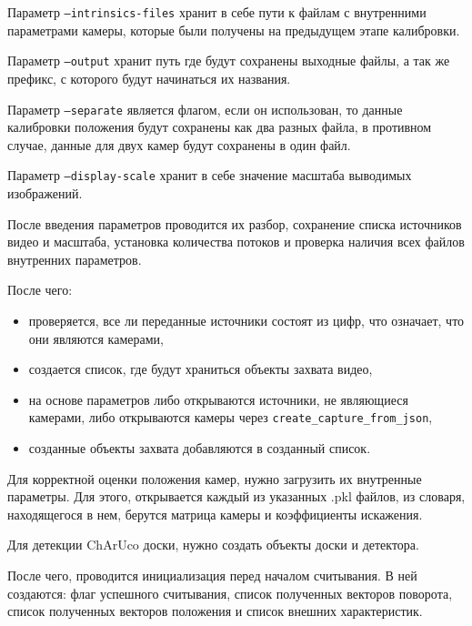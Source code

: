 \documentclass[12pt, a4paper]{article}
\begin{document}
Параметр \texttt{--intrinsics-files} хранит в себе пути к файлам с внутренними
параметрами камеры, которые были получены на предыдущем этапе калибровки.

Параметр \texttt{--output} хранит путь где будут сохранены выходные файлы, а
так же префикс, с которого будут начинаться их названия.

Параметр \texttt{--separate} является флагом, если он использован, то данные
калибровки положения будут сохранены как два разных файла, в противном
случае, данные для двух камер будут сохранены в один файл.

Параметр \texttt{--display-scale} хранит в себе значение масштаба выводимых
изображений.

После введения параметров проводится их разбор, сохранение списка источников
видео и масштаба, установка количества потоков и проверка наличия всех файлов
внутренних параметров.

После чего:
\begin{itemize}
  \item проверяется, все ли переданные источники состоят из цифр, что означает, что они являются камерами,
  \item создается список, где будут храниться объекты захвата видео,
  \item на основе параметров либо открываются источники, не являющиеся
    камерами, либо открываются камеры через
    \texttt{create\_capture\_from\_json},
  \item созданные объекты захвата добавляются в созданный список.
\end{itemize}

Для корректной оценки положения камер, нужно загрузить их внутренные параметры.
Для этого, открывается каждый из указанных .pkl файлов, из словаря,
находящегося в нем, берутся матрица камеры и коэффициенты искажения.

Для детекции ChArUco доски, нужно создать объекты доски и детектора.

После чего, проводится инициализация перед началом считывания. В ней
создаются: флаг успешного считывания, список полученных векторов поворота,
список полученных векторов положения и список внешних характеристик.
\end{document}

